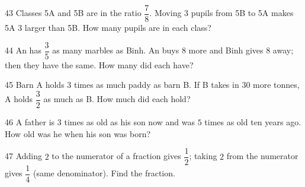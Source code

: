 \gap
\begin{probbox}{43}{}
Classes 5A and 5B are in the ratio $\dfrac78$. Moving $3$ pupils from 5B to 5A makes 5A $3$ larger than 5B. How many pupils are in each class?
\end{probbox}
\gap
\begin{probbox}{44}{}
An has $\dfrac35$ as many marbles as Binh. An buys $8$ more and Binh gives $8$ away; then they have the same. How many did each have?
\end{probbox}
\gap
\begin{probbox}{45}{}
Barn A holds $3$ times as much paddy as barn B. If B takes in $30$ more tonnes, A holds $\dfrac32$ as much as B. How much did each hold?
\end{probbox}
\gap
\begin{probbox}{46}{}
A father is $3$ times as old as his son now and was $5$ times as old ten years ago. How old was he when his son was born?
\end{probbox}
\gap
\begin{probbox}{47}{}
Adding $2$ to the numerator of a fraction gives $\dfrac12$; taking $2$ from the numerator gives $\dfrac14$ (same denominator). Find the fraction.
\end{probbox}
